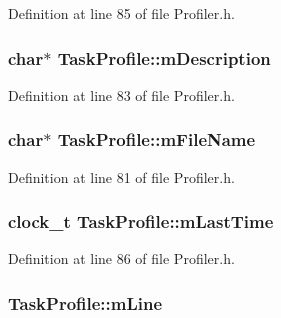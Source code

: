 Definition at line 85 of file Profiler.\+h.

\subsubsection[{\texorpdfstring{m\+Description}{mDescription}}]{\setlength{\rightskip}{0pt plus 5cm}char$\ast$ Task\+Profile\+::m\+Description}\hypertarget{class_task_profile_a8cf7a535ceb435b27d0bc7683734ce02}{}\label{class_task_profile_a8cf7a535ceb435b27d0bc7683734ce02}


Definition at line 83 of file Profiler.\+h.

\subsubsection[{\texorpdfstring{m\+File\+Name}{mFileName}}]{\setlength{\rightskip}{0pt plus 5cm}char$\ast$ Task\+Profile\+::m\+File\+Name}\hypertarget{class_task_profile_aa3d5860921e70930bd807de77f59ca3b}{}\label{class_task_profile_aa3d5860921e70930bd807de77f59ca3b}


Definition at line 81 of file Profiler.\+h.

\subsubsection[{\texorpdfstring{m\+Last\+Time}{mLastTime}}]{\setlength{\rightskip}{0pt plus 5cm}clock\+\_\+t Task\+Profile\+::m\+Last\+Time}\hypertarget{class_task_profile_a1d4412adc40a1b45da8e56416479b13f}{}\label{class_task_profile_a1d4412adc40a1b45da8e56416479b13f}


Definition at line 86 of file Profiler.\+h.

\subsubsection[{\texorpdfstring{m\+Line}{mLine}}]{ Task\+Profile\+::m\+Line}\hypertarget{class_task_profile_a95c1e28714a024a50ef8a693fa4419cd}{}\label{class_task_profile_a95c1e28714a024a50ef8a693fa4419cd}


